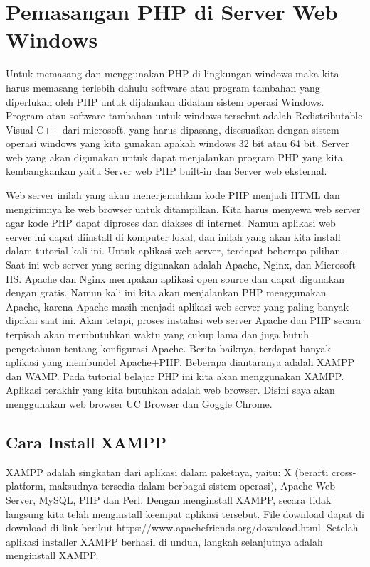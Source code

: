 \section{Pemasangan PHP di Server Web Windows}
Untuk memasang dan menggunakan PHP di lingkungan windows maka kita harus memasang terlebih dahulu software atau program tambahan yang diperlukan oleh PHP untuk dijalankan didalam sistem operasi Windows. Program atau software tambahan untuk windows tersebut adalah Redistributable Visual C++ dari microsoft. yang harus dipasang, disesuaikan dengan sistem operasi windows yang kita gunakan apakah windows 32 bit atau 64 bit. Server web yang akan digunakan untuk dapat menjalankan program PHP yang kita kembangkankan yaitu Server web PHP built-in dan Server web eksternal. 
\par
Web server inilah yang akan menerjemahkan kode PHP menjadi HTML dan mengirimnya ke web browser untuk ditampilkan. Kita harus menyewa web server agar kode PHP dapat diproses dan diakses di internet. Namun aplikasi web server ini dapat diinstall di komputer lokal, dan inilah yang akan kita install dalam tutorial kali ini. Untuk aplikasi web server, terdapat beberapa pilihan. Saat ini web server yang sering digunakan adalah Apache, Nginx, dan Microsoft IIS. Apache dan Nginx merupakan aplikasi open source dan dapat digunakan dengan gratis. Namun kali ini kita akan menjalankan PHP menggunakan Apache, karena Apache masih menjadi aplikasi web server yang paling banyak dipakai saat ini. Akan tetapi, proses instalasi web server Apache dan PHP secara terpisah akan membutuhkan waktu yang cukup lama dan juga butuh pengetahuan tentang konfigurasi Apache. Berita baiknya, terdapat banyak aplikasi yang membundel Apache+PHP. Beberapa diantaranya adalah XAMPP dan WAMP. Pada tutorial belajar PHP ini kita akan menggunakan XAMPP. Aplikasi terakhir yang kita butuhkan adalah web browser. Disini saya akan menggunakan web browser UC Browser dan Goggle Chrome.

\subsection{Cara Install XAMPP}
XAMPP adalah singkatan dari aplikasi dalam paketnya, yaitu: X (berarti cross-platform, maksudnya tersedia dalam berbagai sistem operasi), Apache Web Server, MySQL, PHP dan Perl. Dengan menginstall XAMPP, secara tidak langsung kita telah menginstall keempat aplikasi tersebut. File download dapat di download di link berikut https://www.apachefriends.org/download.html. Setelah aplikasi installer XAMPP berhasil di unduh, langkah selanjutnya adalah menginstall XAMPP. 

